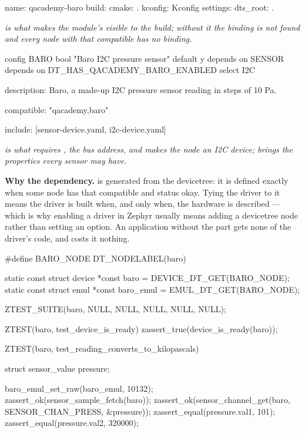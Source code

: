 
\begin{yamlcode}
name: qacademy-baro
build:
  cmake: .
  kconfig: Kconfig
  settings:
    dts_root: .
\end{yamlcode}

\noindent{}

\noindent\emph{ is what makes the module's  visible to the
build; without it the binding is not found and every node with that compatible has no binding.}

\begin{kconfigcode}
config BARO
	bool "Baro I2C pressure sensor"
	default y
	depends on SENSOR
	depends on DT_HAS_QACADEMY_BARO_ENABLED
	select I2C
\end{kconfigcode}

\noindent{}

\begin{yamlcode}
description: Baro, a made-up I2C pressure sensor reading in steps of 10 Pa.

compatible: "qacademy,baro"

include: [sensor-device.yaml, i2c-device.yaml]
\end{yamlcode}

\noindent{}

\noindent\emph{ is what requires , the bus address, and makes the
node an I2C device;  brings the properties every sensor may have.}

\textbf{Why the dependency.}  is generated from the devicetree:
it is defined exactly when some node has that compatible and status okay. Tying the driver to it
means the driver is built when, and only when, the hardware is described --- which is why enabling a
driver in Zephyr usually means adding a devicetree node rather than setting an option. An
application without the part gets none of the driver's code, and  costs it nothing.


\begin{ccode}
#define BARO_NODE DT_NODELABEL(baro)

static const struct device *const baro = DEVICE_DT_GET(BARO_NODE);
static const struct emul *const baro_emul = EMUL_DT_GET(BARO_NODE);

ZTEST_SUITE(baro, NULL, NULL, NULL, NULL, NULL);

ZTEST(baro, test_device_is_ready)
{
	zassert_true(device_is_ready(baro));
}

ZTEST(baro, test_reading_converts_to_kilopascals)
{
	struct sensor_value pressure;

	baro_emul_set_raw(baro_emul, 10132);
	zassert_ok(sensor_sample_fetch(baro));
	zassert_ok(sensor_channel_get(baro, SENSOR_CHAN_PRESS, &pressure));
	zassert_equal(pressure.val1, 101);
	zassert_equal(pressure.val2, 320000);
}
\end{ccode}

